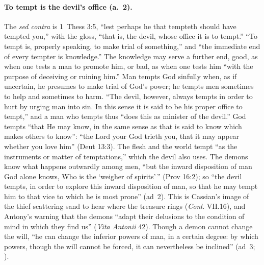 \paragraph{To tempt is the devil's office (a.~2).} The \emph{sed contra} is
1~Thess 3:5, ``lest perhaps he that tempteth should have tempted you,'' with
the gloss, ``that is, the devil, whose office it is to tempt.'' ``To tempt
is, properly speaking, to make trial of something,'' and ``the immediate end
of every tempter is knowledge.'' The knowledge may serve a further end,
good, as when one tests a man to promote him, or bad, as when one tests him
``with the purpose of deceiving or ruining him.'' Man tempts God
sinfully when, as if uncertain, he presumes to make trial of God's power;
he tempts men sometimes to help and sometimes to harm. ``The devil,
however, always tempts in order to hurt by urging man into sin. In this
sense it is said to be his proper office to tempt,'' and a man who tempts
thus ``does this as minister of the devil.'' God tempts ``that He may
know, in the same sense as that is said to know which makes others to
know'': ``the Lord your God trieth you, that it may appear whether you love
him'' (Deut 13:3). The flesh and the world tempt ``as the instruments or
matter of temptations,'' which the devil also uses. The demons know what
happens outwardly among men, ``but the inward disposition of man God alone
knows, Who is the `weigher of spirits'\,'' (Prov 16:2); so ``the devil
tempts, in order to explore this inward disposition of man, so that he may
tempt him to that vice to which he is most prone'' (ad~2). This is
Cassian's image of the thief scattering sand to hear where the treasure
rings (\emph{Conl.} VII.16), and Antony's warning that the demons ``adapt
their delusions to the condition of mind in which they find us''
(\emph{Vita Antonii} 42). Though a demon cannot change the will, ``he can
change the inferior powers of man, in a certain degree: by which powers,
though the will cannot be forced, it can nevertheless be inclined'' (ad~3;
).

